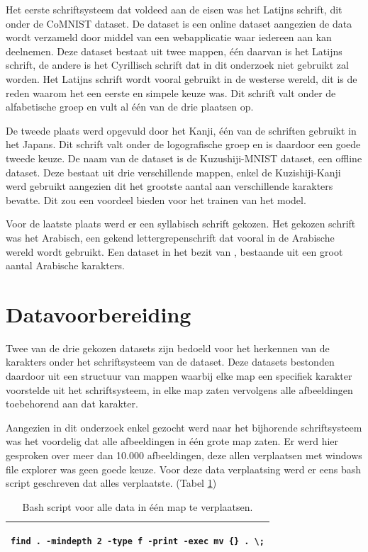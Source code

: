 Het eerste schriftsysteem dat voldeed aan de eisen was het Latijns schrift, dit onder de CoMNIST dataset.
De dataset is een online dataset aangezien de data wordt verzameld door middel van een webapplicatie waar iedereen aan kan deelnemen.
Deze dataset bestaat uit twee mappen, één daarvan is het Latijns schrift, de andere is het Cyrillisch schrift dat in dit onderzoek niet gebruikt zal worden.
Het Latijns schrift wordt vooral gebruikt in de westerse wereld, dit is de reden waarom het een eerste en simpele keuze was.
Dit schrift valt onder de alfabetische groep en vult al één van de drie plaatsen op.

De tweede plaats werd opgevuld door het Kanji, één van de schriften gebruikt in het Japans.
Dit schrift valt onder de logografische groep en is daardoor een goede tweede keuze.
De naam van de dataset is de Kuzushiji-MNIST dataset, een offline dataset.
Deze bestaat uit drie verschillende mappen, enkel de Kuzishiji-Kanji werd gebruikt aangezien dit het grootste aantal aan verschillende karakters bevatte.
Dit zou een voordeel bieden voor het trainen van het model.

Voor de laatste plaats werd er een syllabisch schrift gekozen.
Het gekozen schrift was het Arabisch, een gekend lettergrepenschrift dat vooral in de Arabische wereld wordt gebruikt.
Een dataset in het bezit van \autocite{Ahmed2017}, bestaande uit een groot aantal Arabische karakters.

\section{Datavoorbereiding}

Twee van de drie gekozen datasets zijn bedoeld voor het herkennen van de karakters onder het schriftsysteem van de dataset.
Deze datasets bestonden daardoor uit een structuur van mappen waarbij elke map een specifiek karakter voorstelde uit het schriftsysteem, in elke map zaten vervolgens alle afbeeldingen toebehorend aan dat karakter.

Aangezien in dit onderzoek enkel gezocht werd naar het bijhorende schriftsysteem was het voordelig dat alle afbeeldingen in één grote map zaten.
Er werd hier gesproken over meer dan 10.000 afbeeldingen, deze allen verplaatsen met windows file explorer was geen goede keuze.
Voor deze data verplaatsing werd er eens bash script geschreven dat alles verplaatste. (Tabel \ref{table:BashScript})

\begin{table}[!htbp]
    \begin{tabular}{|l|}
        \hline
        \begin{lstlisting}
find . -mindepth 2 -type f -print -exec mv {} . \;
        \end{lstlisting}
        \\ \hline
    \end{tabular}
    \caption{Bash script voor alle data in één map te verplaatsen. }\label{table:BashScript}
\end{table}

